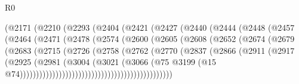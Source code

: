 \begin{lexlean}{R0}
\begin{coremodule}
                        (@2171
                          (@2210
                            (@2293
                              (@2404
                                (@2421
                                  (@2427
                                    (@2440
                                      (@2444
                                        (@2448
                                          (@2457
                                            (@2464
                                              (@2471
                                                (@2478
                                                  (@2574
                                                    (@2600
                                                      (@2605
                                                        (@2608
                                                          (@2652
                                                            (@2674
                                                              (@2679
                                                                (@2683
                                                                  (@2715
                                                                    (@2726
                                                                      (@2758
                                                                        (@2762
                                                                          (@2770
                                                                            (@2837
                                                                              (@2866
                                                                                (@2911
                                                                                  (@2917
                                                                                    (@2925
                                                                                      (@2981
                                                                                        (@3004
                                                                                          (@3021
                                                                                            (@3066
                                                                                              (@75
                                                                                                @3199
                                                                                                (@15
                                                                                                  @74)))))))))))))))))))))))))))))))))))))))))))))))

\end{coremodule}
\end{lexlean}

